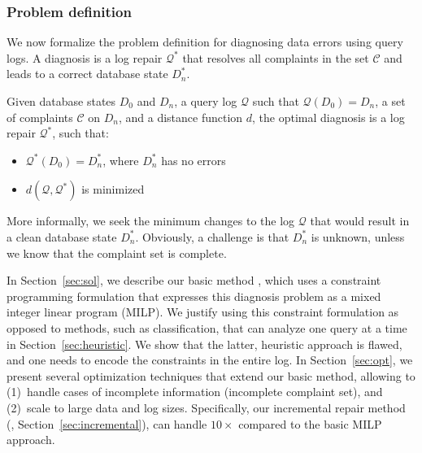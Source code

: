 \subsubsection*{Problem definition}

We now formalize the problem definition for diagnosing data
errors using query logs. A diagnosis is a log repair
$\mathcal{Q}^*$ that resolves all complaints in the set $\mathcal{C}$
and leads to a correct database state $D_n^*$.

\begin{definition}\label{def:problem}
    Given database states $D_0$ and $D_n$, a query log $\mathcal{Q}$ such that $\mathcal{Q}(D_0)=D_n$, a set of complaints $\mathcal{C}$ on $D_n$,  and a distance function $d$, the optimal diagnosis is a log repair $\mathcal{Q}^*$, such that:
    \begin{itemize}[itemsep=0pt, parsep=0pt]
        \item $\mathcal{Q}^*(D_0)=D_n^*$, where $D_n^*$ has no errors
        \item $d(\mathcal{Q}, \mathcal{Q}^*)$ is minimized
    \end{itemize}
\end{definition}

More informally, we seek the minimum changes to the log $\mathcal{Q}$
that would result in a clean database state $D_n^*$. Obviously, a
challenge is that $D_n^*$ is unknown, unless we know that the
complaint set is complete. 

In Section~\ref{sec:sol}, we describe our basic method \naive, which
uses a constraint programming formulation that expresses this
diagnosis problem as a mixed integer linear program (MILP). We justify
using this constraint formulation as opposed to methods, such as
classification, that can analyze one query at a time in
Section~\ref{sec:heuristic}. We show that the latter, heuristic
approach is flawed, and one needs to encode the constraints in the
entire log. In Section~\ref{sec:opt}, we present several optimization
techniques that extend our basic method, allowing \sys to (1)~handle
cases of incomplete information (incomplete complaint set), and
(2)~scale to large data and log sizes. Specifically, our incremental
repair method (\incremental, Section~\ref{sec:incremental}), can
handle $10\times$ compared to the basic MILP approach.





\fi




